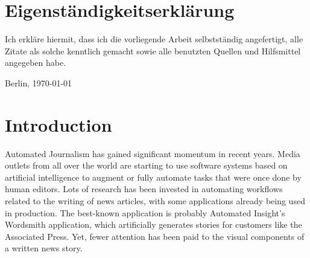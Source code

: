 \documentclass[11pt,a4paper,twoside]{article}
\begin{document}
\clearpage

\section*{Eigenständigkeitserklärung}


\noindent Ich erkläre hiermit, dass ich die vorliegende Arbeit
selbstständig angefertigt, alle Zitate als solche kenntlich gemacht
sowie alle benutzten Quellen und Hilfsmittel angegeben habe.

\bigskip\noindent Berlin, \today

\vspace{4ex}\noindent\makebox[7cm]{\dotfill}


\cleardoublepage
\pagestyle{fancy}
\setcounter{page}{1}

\tableofcontents


\cleardoublepage

\setcounter{page}{1}
\fancyhead[LE,RO]{\rightmark}
\fancyfoot[LE,RO]{\thepage}

\section{Introduction}

Automated Journalism has gained significant momentum in recent years. Media outlets from all over the world are starting to use software systems based on artificial intelligence to augment or fully automate tasks that were once done by human editors. Lots of research has been invested in automating workflows related to the writing of news articles, with some applications already being used in production. The best-known application is probably Automated Insight's Wordsmith application, which artificially generates stories for customers like the Associated Press. \cite{AssociatedPressAutomatedInsights} Yet, fewer attention has been paid to the visual components of a written news story. 
\end{document}
